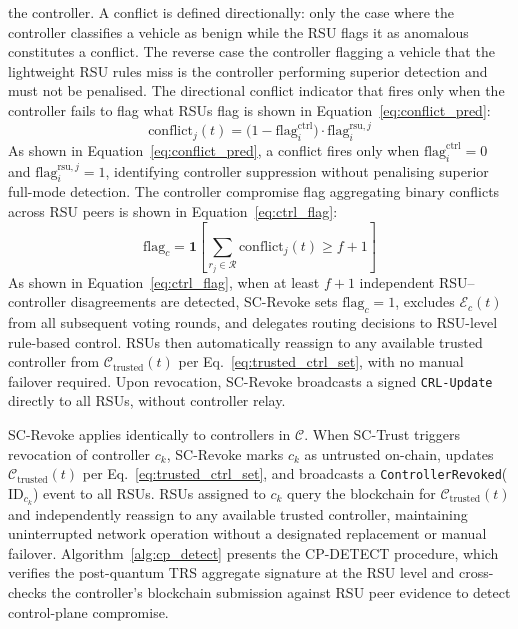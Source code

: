 \documentclass[12pt, a4paper]{report}
\begin{document}
the controller. A conflict is defined directionally: only
the case where the controller classifies a vehicle as benign
while the RSU flags it as anomalous constitutes a conflict. The
reverse case the controller flagging a vehicle that the
lightweight RSU rules miss is the controller performing
superior detection and must not be penalised. The directional
conflict indicator that fires only when the controller fails to
flag what RSUs flag is shown in
Equation~\eqref{eq:conflict_pred}:
\begin{equation}
  \mathrm{conflict}_j(t) =
    \bigl(1 - \mathrm{flag}_i^{\mathrm{ctrl}}\bigr)
    \cdot
    \mathrm{flag}_i^{\mathrm{rsu},j}
  \label{eq:conflict_pred}
\end{equation}
As shown in Equation~\eqref{eq:conflict_pred}, a conflict fires
only when $\mathrm{flag}_i^{\mathrm{ctrl}} = 0$ and
$\mathrm{flag}_i^{\mathrm{rsu},j} = 1$, identifying controller
suppression without penalising superior full-mode detection.
The controller compromise flag aggregating binary conflicts
across RSU peers is shown in Equation~\eqref{eq:ctrl_flag}:
\begin{equation}
  \mathrm{flag}_c = \mathbf{1}\!\left[
    \sum_{r_j \in \mathcal{R}}
    \mathrm{conflict}_j(t) \geq f + 1\right]
  \label{eq:ctrl_flag}
\end{equation}
As shown in Equation~\eqref{eq:ctrl_flag}, when at least $f+1$
independent RSU--controller disagreements are detected,
SC-Revoke sets $\mathrm{flag}_c = 1$, excludes
$\mathcal{E}_c(t)$ from all subsequent voting rounds, and
delegates routing decisions to RSU-level rule-based control.
RSUs then automatically reassign to any available trusted
controller from $\mathcal{C}_{\mathrm{trusted}}(t)$ per
Eq.~\eqref{eq:trusted_ctrl_set}, with no manual failover
required. Upon revocation, SC-Revoke broadcasts a signed
\texttt{CRL-Update} directly to all RSUs, without controller
relay.

SC-Revoke applies identically to controllers in $\mathcal{C}$.
When SC-Trust triggers revocation of controller $c_k$, SC-Revoke
marks $c_k$ as untrusted on-chain, updates
$\mathcal{C}_{\mathrm{trusted}}(t)$ per
Eq.~\eqref{eq:trusted_ctrl_set}, and broadcasts a
\texttt{ControllerRevoked}($\mathrm{ID}_{c_k}$) event to all
RSUs. RSUs assigned to $c_k$ query the blockchain for
$\mathcal{C}_{\mathrm{trusted}}(t)$ and independently reassign
to any available trusted controller, maintaining uninterrupted
network operation without a designated replacement or manual
failover.
\newline
\newline
Algorithm~\ref{alg:cp_detect} presents the CP-DETECT procedure,
which verifies the post-quantum TRS aggregate signature at the RSU
level and cross-checks the controller's blockchain submission against
RSU peer evidence to detect control-plane compromise.
\end{document}
